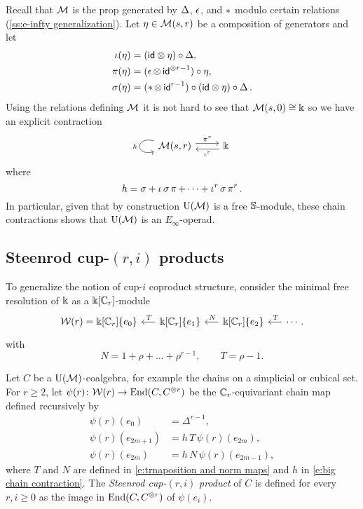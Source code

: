 Recall that $\mathcal{M}$ is the prop generated by $\operatorname{\Delta}$, $\operatorname{\epsilon}$, and $\operatorname{\ast}$ modulo certain relations (\cref{ss:e-infty generalization}).
Let $\eta \in \mathcal{M}(s,r)$ be a composition of generators and let
\begin{align*}
\operatorname{\iota}(\eta) & = (\mathsf{id} \otimes \eta) \circ \operatorname{\Delta}, \\
\operatorname{\pi}(\eta) & = (\operatorname{\epsilon} \otimes \, \mathsf{id}^{\otimes r-1}) \circ \eta, \\
\sigma(\eta) & = (\operatorname{\ast} \otimes \, \mathsf{id}^{r-1}) \circ (\mathsf{id} \otimes \eta) \circ \operatorname{\Delta}.
\end{align*}
Using the relations defining $\mathcal{M}$ it is not hard to see that $\mathcal{M}(s,0) \cong \Bbbk$ so we have an explicit contraction
\[
\begin{tikzcd}
\arrow[loop, distance=2em, in=195, out=165, "h"'] \M(s,r) \arrow[r, shift left=3pt, "\proj^r"] &
\k \arrow[l, shift left=3pt, "\incl^r"]
\end{tikzcd}
\]
where
\begin{equation} \label{e:big chain contraction}
h = \sigma + \operatorname{\iota} \sigma \operatorname{\pi} + \dots + \operatorname{\iota}^{r} \sigma \operatorname{\pi}^{r}.
\end{equation}
In particular, given that by construction ${\operatorname{U}(\mathcal{M})}$ is a free $\mathbb{S}$-module, these chain contractions shows that ${\operatorname{U}(\mathcal{M})}$ is an $E_\infty$-operad.

\subsection{Steenrod cup-$(r,i)$ products}

To generalize the notion of cup-$i$ coproduct structure, consider the minimal free resolution of $\Bbbk$ as a $\Bbbk[\mathbb{C}_r]$-module
\begin{equation} \label{e:minimal resolution r>2}
\begin{tikzcd} [column sep = .5cm]
\mathcal W(r) = \k[\Cyc_r]\{e_0\} & \arrow[l, "\,T"'] \k[\Cyc_r]\{e_1\} & \arrow[l, "\,N"'] \k[\Cyc_r]\{e_2\} & \arrow[l, "\,T"'] \cdots.
\end{tikzcd}
\end{equation}
with
\begin{equation} \label{e:trnaposition and norm maps}
N = 1 + \rho + \dots + \rho^{r-1}, \qquad
T = \rho - 1.
\end{equation}

Let $C$ be a ${\operatorname{U}(\mathcal{M})}$-coalgebra, for example the chains on a simplicial or cubical set.
For $r \geq 2$, let $\psi(r) \colon \mathcal{W}(r) \to \mathrm{End}(C, C^{\otimes r})$ be the $\mathbb{C}_r$-equivariant chain map defined recursively by
\begin{equation}\label{e:definition of psi}
\begin{split}
\psi(r)(e_0) & = \Delta^{r-1}, \\
\psi(r)(e_{2m+1}) & = h\,T\,\psi(r)(e_{2m}), \\
\psi(r)(e_{2m}) & = h\,N\,\psi(r)(e_{2m-1}),
\end{split}
\end{equation}
where $T$ and $N$ are defined in \eqref{e:trnaposition and norm maps} and $h$ in \eqref{e:big chain contraction}.
The \textit{Steenrod cup-}$(r, i)$ \textit{product} of $C$ is defined for every $r, i \geq 0$ as the image in $\mathrm{End}(C, C^{\otimes r})$ of $\psi(e_i)$.

